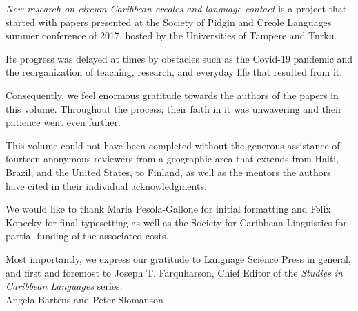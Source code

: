 \addchap{\lsAcknowledgementTitle} 

\emph{New research on circum-Caribbean creoles and language contact} is
a project that started with papers presented at the Society of Pidgin
and Creole Languages summer conference of 2017, hosted by the
Universities of Tampere and Turku.

Its progress was delayed at times by obstacles such as the Covid-19
pandemic and the reorganization of teaching, research, and everyday life
that resulted from it.

Consequently, we feel enormous gratitude towards the authors of the
papers in this volume. Throughout the process, their faith in it was
unwavering and their patience went even further.

This volume could not have been completed without the generous
assistance of fourteen anonymous reviewers from a geographic area that
extends from Haiti, Brazil, and the United States, to Finland, as well
as the mentors the authors have cited in their individual
acknowledgments.

We would like to thank Maria Pesola-Gallone for initial formatting and
Felix Kopecky for final typesetting as well as the Society for Caribbean
Linguistics for partial funding of the associated costs.

Most importantly, we express our gratitude to Language Science Press in
general, and first and foremost to Joseph T. Farquharson, Chief Editor
of the \emph{Studies in Caribbean Languages} series.\bigskip\\
\noindent Angela Bartens and Peter Slomanson
